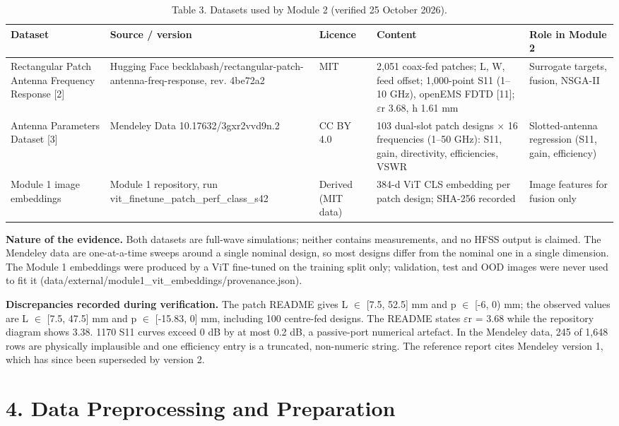 \documentclass[11pt,a4paper]{article}
\begin{document}
\begin{table}[H]\centering\small
\caption*{Table 3. Datasets used by Module 2 (verified 25 October 2026).}
\begin{tabularx}{\linewidth}{XXXXX}
\toprule
\textbf{Dataset} & \textbf{Source / version} & \textbf{Licence} & \textbf{Content} & \textbf{Role in Module 2} \\
\midrule
Rectangular Patch Antenna Frequency Response [2] & Hugging Face becklabash/rectangular-patch-antenna-freq-response, rev. 4be72a2 & MIT & 2,051 coax-fed patches; L, W, feed offset; 1,000-point S11 (1--10 GHz), openEMS FDTD [11]; $\varepsilon$r 3.68, h 1.61 mm & Surrogate targets, fusion, NSGA-II \\
Antenna Parameters Dataset [3] & Mendeley Data 10.17632/3gxr2vvd9n.2 & CC BY 4.0 & 103 dual-slot patch designs $\times$ 16 frequencies (1--50 GHz): S11, gain, directivity, efficiencies, VSWR & Slotted-antenna regression (S11, gain, efficiency) \\
Module 1 image embeddings & Module 1 repository, run vit\_finetune\_patch\_perf\_class\_s42 & Derived (MIT data) & 384-d ViT CLS embedding per patch design; SHA-256 recorded & Image features for fusion only \\
\bottomrule
\end{tabularx}
\end{table}
\textbf{Nature of the evidence.} Both datasets are full-wave simulations; neither contains measurements, and no HFSS output is claimed. The Mendeley data are one-at-a-time sweeps around a single nominal design, so most designs differ from the nominal one in a single dimension. The Module 1 embeddings were produced by a ViT fine-tuned on the training split only; validation, test and OOD images were never used to fit it (data/external/module1\_vit\_embeddings/provenance.json).

\textbf{Discrepancies recorded during verification.} The patch README gives L $\in$ [7.5, 52.5] mm and p $\in$ [-6, 0) mm; the observed values are L $\in$ [7.5, 47.5] mm and p $\in$ [-15.83, 0] mm, including 100 centre-fed designs. The README states $\varepsilon$r = 3.68 while the repository diagram shows 3.38. 1170 S11 curves exceed 0 dB by at most 0.2 dB, a passive-port numerical artefact. In the Mendeley data, 245 of 1,648 rows are physically implausible and one efficiency entry is a truncated, non-numeric string. The reference report cites Mendeley version 1, which has since been superseded by version 2.

\section*{4. Data Preprocessing and Preparation}
\end{document}
